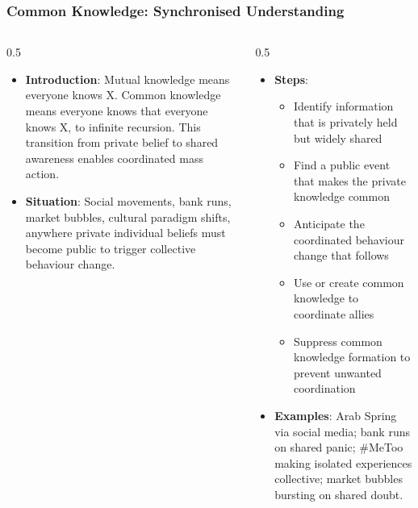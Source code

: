 \begin{frame}[fragile]\frametitle{Common Knowledge: Synchronised Understanding}
\begin{columns}
    \begin{column}[T]{0.5\linewidth}
      \begin{itemize}
        \item \textbf{Introduction}: Mutual knowledge means everyone knows X. Common knowledge means everyone knows that everyone knows X, to infinite recursion. This transition from private belief to shared awareness enables coordinated mass action.
        \item \textbf{Situation}: Social movements, bank runs, market bubbles, cultural paradigm shifts, anywhere private individual beliefs must become public to trigger collective behaviour change.
      \end{itemize}
    \end{column}
    \begin{column}[T]{0.5\linewidth}
      \begin{itemize}
        \item \textbf{Steps}:
        \begin{itemize}
          \item Identify information that is privately held but widely shared
          \item Find a public event that makes the private knowledge common
          \item Anticipate the coordinated behaviour change that follows
          \item Use or create common knowledge to coordinate allies
          \item Suppress common knowledge formation to prevent unwanted coordination
        \end{itemize}\item \textbf{Examples}: Arab Spring via social media; bank runs on shared panic; \#MeToo making isolated experiences collective; market bubbles bursting on shared doubt.
      \end{itemize}
    \end{column}
  \end{columns}
\end{frame}

